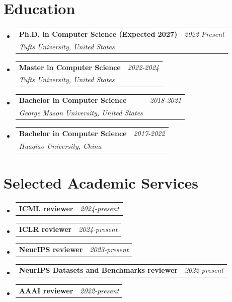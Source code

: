 \documentclass[a4paper,11pt]{article}
\makeatletter
\newcommand{\resumePOR}[3]{
\vspace{0.5mm}\item
    \begin{tabular*}{0.97\textwidth}[t]{l@{\extracolsep{\fill}}r}
        \textbf{#1}\hspace{0.3mm}#2 & \textit{\small{#3}}
    \end{tabular*}
    \vspace{-2mm}
}
\newcommand{\resumeSubheading}[4]{
\vspace{0.5mm}\item
    \begin{tabular*}{0.98\textwidth}[t]{l@{\extracolsep{\fill}}r}
        \textbf{#1} & \textit{\footnotesize{#4}} \\
        \textit{\footnotesize{#3}} &  \footnotesize{#2}\\
    \end{tabular*}
    \vspace{-2.4mm}
}
\newcommand{\resumeSubHeadingListStart}{\begin{itemize}[leftmargin=*,labelsep=0mm]}
\newcommand{\resumeSubHeadingListEnd}{\end{itemize}\vspace{2mm}}
\makeatother
\begin{document}
\section{\textbf{Education}}
  \resumeSubHeadingListStart
    \resumeSubheading
      {Ph.D. in Computer Science (Expected 2027)}{}
      {Tufts University, United States}{2022-Present}
    \resumeSubheading
      {Master in Computer Science}{}
      {Tufts University, United States}{2022-2024}
    \resumeSubheading
      {Bachelor in Computer Science}{}
      {George Mason University, United States}{2018-2021}
    \resumeSubheading
      {Bachelor in Computer Science}{}
      {Huaqiao University, China}{2017-2022}
  \resumeSubHeadingListEnd
\vspace{-5.5mm}

\section{\textbf{Selected Academic Services}}
\vspace{-0.4mm}
\resumeSubHeadingListStart
\resumePOR{ICML reviewer}{} {2024-present}
\resumePOR{ICLR reviewer}{} {2024-present}
\resumePOR{NeurIPS reviewer}{} {2023-present}
\resumePOR{NeurIPS Datasets and Benchmarks reviewer}{} {2022-present}
\resumePOR{AAAI reviewer}{} {2022-present}
\resumeSubHeadingListEnd
\vspace{-5mm}
\end{document}

